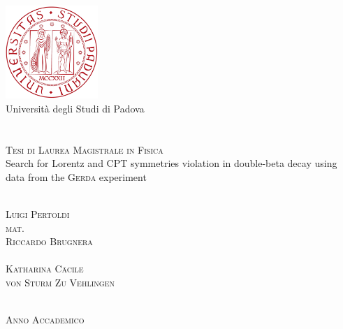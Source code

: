 \documentclass[11pt, a4paper, twoside, draft]{article}
\begin{document}
\begin{titlepage}
	\thispagestyle{empty}
	\begin{center}
	\includegraphics[width=3.5cm]{img/logo.pdf} \\
	\vspace{0.5cm}
	{\Large Universit\`a degli Studi di Padova} \\
	\hrulefill \\
	 \\
	\vspace{2cm}
	\textsc{\large Tesi di Laurea Magistrale in Fisica} \\
	\vspace{3cm}
	\huge{Search for Lorentz and CPT symmetries violation in double-beta decay using data from the \textsc{Gerda} experiment}
	\end{center}
	\vspace{3cm}
	\begin{multicols}{2}
	\large
	\noindent
	 \\
	\textsc{Luigi Pertoldi} \\
	\normalsize{\textsc{mat.}~}
	\columnbreak
	\flushright
	 \\
	\textsc{Riccardo Brugnera} \\
	\vspace{5mm}
	 \\
	\textsc{Katharina Cäcile\\von Sturm Zu Vehlingen}
	\end{multicols}
	\vspace*{\fill}
	\begin{center}
	\hrulefill \\
	\textsc{Anno Accademico }
	\end{center}
\end{titlepage}
%
%
%
%
%



\end{document}

